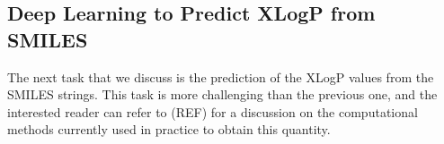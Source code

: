     
    \subsection{Deep Learning to Predict XLogP from SMILES}
    The next task that we discuss is the prediction of the XLogP values from the SMILES strings. This task is more challenging than the previous one, and the interested reader can refer to (REF) for a discussion on the computational methods currently used  in practice to obtain 
    this quantity.  
    
